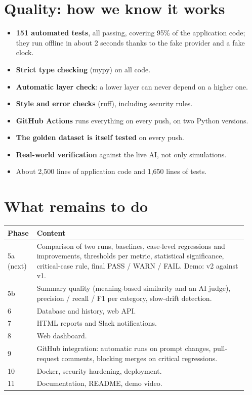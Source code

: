 \documentclass[11pt,a4paper]{article}
\begin{document}
\section{Quality: how we know it works}
\begin{itemize}
  \item \textbf{151 automated tests}, all passing, covering 95\% of the application code; they
        run offline in about 2 seconds thanks to the fake provider and a fake clock.
  \item \textbf{Strict type checking} (mypy) on all code.
  \item \textbf{Automatic layer check}: a lower layer can never depend on a higher one.
  \item \textbf{Style and error checks} (ruff), including security rules.
  \item \textbf{GitHub Actions} runs everything on every push, on two Python versions.
  \item \textbf{The golden dataset is itself tested} on every push.
  \item \textbf{Real-world verification} against the live AI, not only simulations.
  \item About 2{,}500 lines of application code and 1{,}650 lines of tests.
\end{itemize}

\section{What remains to do}

\begin{longtable}{@{}p{0.1\linewidth}p{0.84\linewidth}@{}}
\toprule
\textbf{Phase} & \textbf{Content} \\
\midrule
\endhead
5a (next) & Comparison of two runs, baselines, case-level regressions and improvements, thresholds per metric, statistical significance, critical-case rule, final PASS / WARN / FAIL. Demo: v2 against v1. \\
5b & Summary quality (meaning-based similarity and an AI judge), precision / recall / F1 per category, slow-drift detection. \\
6 & Database and history, web API. \\
7 & HTML reports and Slack notifications. \\
8 & Web dashboard. \\
9 & GitHub integration: automatic runs on prompt changes, pull-request comments, blocking merges on critical regressions. \\
10 & Docker, security hardening, deployment. \\
11 & Documentation, README, demo video. \\
\bottomrule
\end{longtable}
\end{document}
